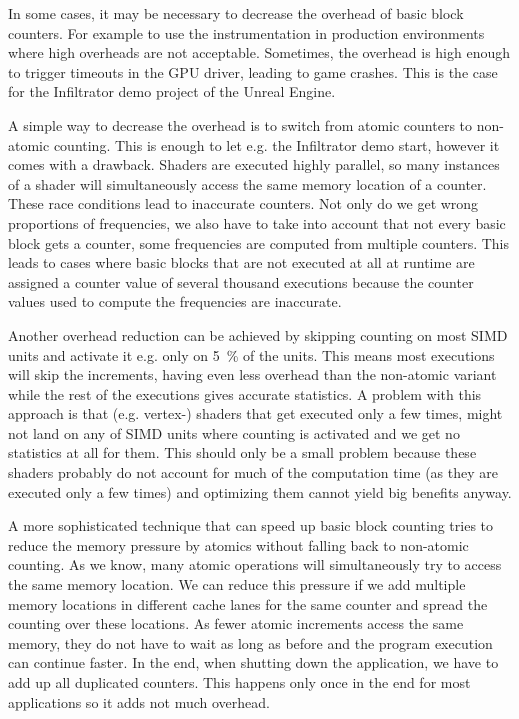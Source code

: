 \begin{table}
\centering
{}
\label{tab:overhead}
\end{table}

In some cases, it may be necessary to decrease the overhead of basic block counters. For example to use the instrumentation in production environments where high overheads are not acceptable.
Sometimes, the overhead is high enough to trigger timeouts in the GPU driver, leading to game crashes. This is the case for the Infiltrator demo project of the Unreal Engine.

A simple way to decrease the overhead is to switch from atomic counters to non-atomic counting. This is enough to let e.g. the Infiltrator demo start, however it comes with a drawback. Shaders are executed highly parallel, so many instances of a shader will simultaneously access the same memory location of a counter.
These race conditions lead to inaccurate counters. Not only do we get wrong proportions of frequencies, we also have to take into account that not every basic block gets a counter, some frequencies are computed from multiple counters. This leads to cases where basic blocks that are not executed at all at runtime are assigned a counter value of several thousand executions because the counter values used to compute the frequencies are inaccurate.

Another overhead reduction can be achieved by skipping counting on most SIMD units and activate it e.g. only on \SI{5}{\percent} of the units.
This means most executions will skip the increments, having even less overhead than the non-atomic variant while the rest of the executions gives accurate statistics.
A problem with this approach is that (e.g. vertex-) shaders that get executed only a few times, might not land on any of SIMD units where counting is activated and we get no statistics at all for them.
This should only be a small problem because these shaders probably do not account for much of the computation time (as they are executed only a few times) and optimizing them cannot yield big benefits anyway.

A more sophisticated technique that can speed up basic block counting tries to reduce the memory pressure by atomics without falling back to non-atomic counting.
As we know, many atomic operations will simultaneously try to access the same memory location.
We can reduce this pressure if we add multiple memory locations in different cache lanes for the same counter and spread the counting over these locations.
As fewer atomic increments access the same memory, they do not have to wait as long as before and the program execution can continue faster.
In the end, when shutting down the application, we have to add up all duplicated counters.
This happens only once in the end for most applications so it adds not much overhead.
